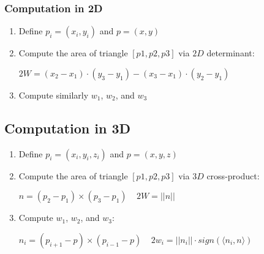 \documentclass{article}
\begin{document}
\subsubsection{Computation in 2D}
\begin{enumerate}
    \item Define $p_i = (x_i,y_i)$ and $p = (x,y)$
    \item Compute the area of triangle $[p1, p2, p3]$ via $2D$ determinant:
        \begin{center}
            $2W = (x_2 - x_1)\cdot(y_3 - y_1) - (x_3 - x_1) \cdot (y_2 - y_1)$
        \end{center}
    \item Compute similarly $w_1$, $w_2$, and $w_3$
\end{enumerate}
\subsection{Computation in 3D}
\begin{enumerate}
    \item Define $p_i = (x_i,y_i, z_i)$ and $p = (x,y,z)$
    \item Compute the area of triangle $[p1, p2, p3]$ via $3D$ cross-product:
        \begin{center}
            $ n = (p_2 - p_1) \times (p_3 - p_1) \ \ \ \ \ 2W = ||n|| $
        \end{center}
    \item Compute $w_1$, $w_2$, and $w_3$:
        \begin{center}
            $n_i = (p_{i + 1} - p) \times (p_{i - 1} - p) \ \ \ \ \ 2w_i = ||n_i|| \cdot sign(\langle n_i, n\rangle)$
        \end{center}
\end{enumerate}
\end{document}
